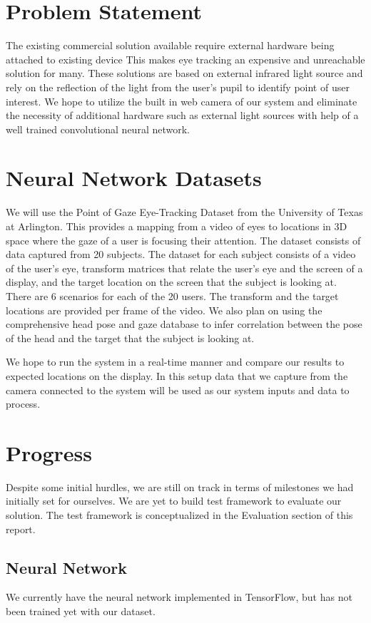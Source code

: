 \documentclass[10pt,twocolumn,letterpaper]{article}
\begin{document}
\section{Problem Statement}
The existing commercial solution available require external hardware
being attached to existing device\cite{eyetrackerlist}\cite{tobii_1} This makes eye tracking an
expensive and unreachable solution for many. These solutions are based
on external infrared light source and rely on the reflection of the
light from the user’s pupil to identify point of user interest. We hope to
utilize the built in web camera of our system and eliminate the necessity
of additional hardware such as external light sources with help of a
well trained convolutional neural network.


\section{Neural Network Datasets}
We will use the Point of Gaze Eye-Tracking Dataset from the University
of Texas at Arlington\cite{eyetracking}. This provides a mapping from
a video of eyes to locations in 3D space where the gaze of a user is
focusing their attention. The dataset consists of data captured from
20 subjects. The dataset for each subject consists of a video of the
user’s eye, transform matrices that relate the user’s eye and the
screen of a display, and the target location on the screen that the
subject is looking at. There are 6 scenarios for each of the 20
users. The transform and the target locations are provided per frame
of the video. We also plan on using the comprehensive head pose and
gaze database\cite{mcmurrough} to infer correlation between the pose
of the head and the target that the subject is looking at.

We hope to run the system in a real-time manner and compare our
results to expected locations on the display. In this setup data that
we capture from the camera connected to the system will be used as our
system inputs and data to process.

\section{Progress}
Despite some initial hurdles, we are still on track in terms of milestones 
we had initially set for ourselves. We are yet to build test framework 
to evaluate our solution. The test framework is conceptualized 
in the Evaluation section of this report.

\subsection{Neural Network}
We currently have the neural network implemented in TensorFlow, but
has not been trained yet with our dataset.
\end{document}
